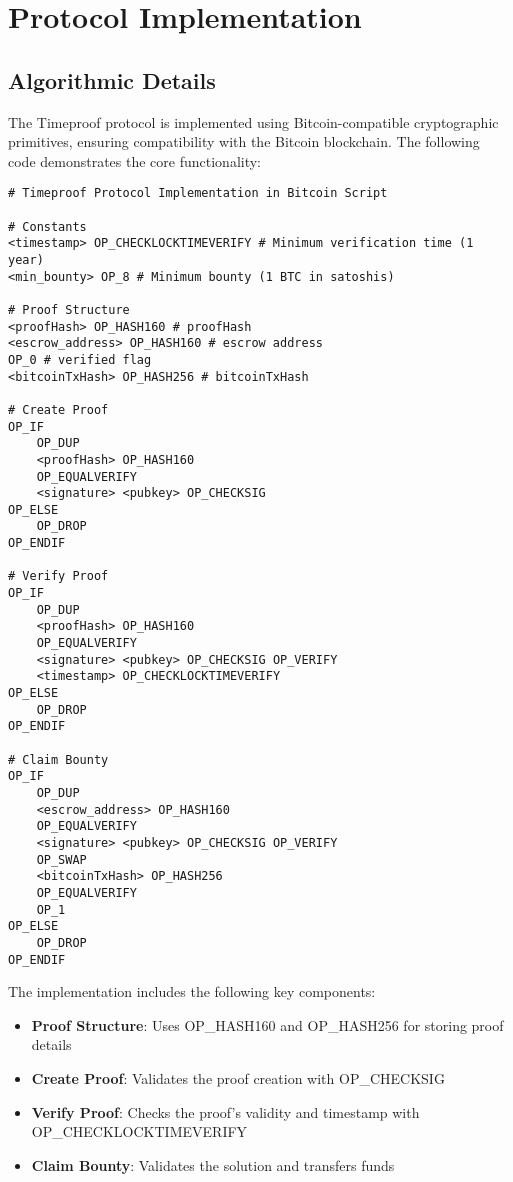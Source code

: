 \documentclass[12pt]{report}
\begin{document}
\section{Protocol Implementation}
\subsection{Algorithmic Details}

The Timeproof protocol is implemented using Bitcoin-compatible cryptographic primitives, ensuring compatibility with the Bitcoin blockchain. The following code demonstrates the core functionality:

\begin{verbatim}
# Timeproof Protocol Implementation in Bitcoin Script

# Constants
<timestamp> OP_CHECKLOCKTIMEVERIFY # Minimum verification time (1 year)
<min_bounty> OP_8 # Minimum bounty (1 BTC in satoshis)

# Proof Structure
<proofHash> OP_HASH160 # proofHash
<escrow_address> OP_HASH160 # escrow address
OP_0 # verified flag
<bitcoinTxHash> OP_HASH256 # bitcoinTxHash

# Create Proof
OP_IF
    OP_DUP
    <proofHash> OP_HASH160
    OP_EQUALVERIFY
    <signature> <pubkey> OP_CHECKSIG
OP_ELSE
    OP_DROP
OP_ENDIF

# Verify Proof
OP_IF
    OP_DUP
    <proofHash> OP_HASH160
    OP_EQUALVERIFY
    <signature> <pubkey> OP_CHECKSIG OP_VERIFY
    <timestamp> OP_CHECKLOCKTIMEVERIFY
OP_ELSE
    OP_DROP
OP_ENDIF

# Claim Bounty
OP_IF
    OP_DUP
    <escrow_address> OP_HASH160
    OP_EQUALVERIFY
    <signature> <pubkey> OP_CHECKSIG OP_VERIFY
    OP_SWAP
    <bitcoinTxHash> OP_HASH256
    OP_EQUALVERIFY
    OP_1
OP_ELSE
    OP_DROP
OP_ENDIF
\end{verbatim}

The implementation includes the following key components:

\begin{itemize}
    \item \textbf{Proof Structure}: Uses OP\_HASH160 and OP\_HASH256 for storing proof details
    \item \textbf{Create Proof}: Validates the proof creation with OP\_CHECKSIG
    \item \textbf{Verify Proof}: Checks the proof's validity and timestamp with OP\_CHECKLOCKTIMEVERIFY
    \item \textbf{Claim Bounty}: Validates the solution and transfers funds
\end{itemize}
\end{document}
